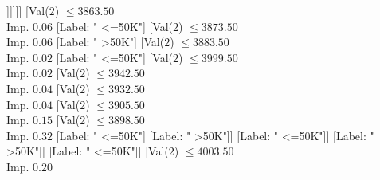 \documentclass[margin=10pt]{standalone}
\begin{document}
\begin{forest}
																																					[Val($2$) $ \leq 3799.50$ \\ Imp. $0.02$
																																						[Val($2$) $ \leq 3706.50$ \\ Imp. $0.04$
																																							[Label: " <=50K"]
																																							[Val($2$) $ \leq 3718.50$ \\ Imp. $0.09$
																																								[Label: " >50K"]
																																								[Val($2$) $ \leq 3754.50$ \\ Imp. $0.19$
																																									[Label: " <=50K"]
																																									[Val($2$) $ \leq 3780.50$ \\ Imp. $0.05$
																																										[Label: " <=50K"]
																																										[Val($2$) $ \leq 3786.50$ \\ Imp. $0.25$
																																											[Label: " >50K"]
																																											[Label: " <=50K"]]]]]]
																																						[Val($2$) $ \leq 3863.50$ \\ Imp. $0.06$
																																							[Label: " <=50K"]
																																							[Val($2$) $ \leq 3873.50$ \\ Imp. $0.06$
																																								[Label: " >50K"]
																																								[Val($2$) $ \leq 3883.50$ \\ Imp. $0.02$
																																									[Label: " <=50K"]
																																									[Val($2$) $ \leq 3999.50$ \\ Imp. $0.02$
																																										[Val($2$) $ \leq 3942.50$ \\ Imp. $0.04$
																																											[Val($2$) $ \leq 3932.50$ \\ Imp. $0.04$
																																												[Val($2$) $ \leq 3905.50$ \\ Imp. $0.15$
																																													[Val($2$) $ \leq 3898.50$ \\ Imp. $0.32$
																																														[Label: " <=50K"]
																																														[Label: " >50K"]]
																																													[Label: " <=50K"]]
																																												[Label: " >50K"]]
																																											[Label: " <=50K"]]
																																										[Val($2$) $ \leq 4003.50$ \\ Imp. $0.20$

\end{forest}
\end{document}
